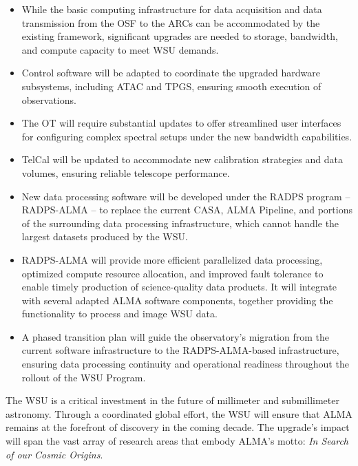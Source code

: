 \begin{itemize}[itemsep=-0.5em]
    \item While the basic computing infrastructure for data acquisition and data transmission from the \ac{OSF} to the \aclp{ARC} can be accommodated by the existing framework, significant upgrades are needed to storage, bandwidth, and compute capacity to meet WSU demands.

    \item Control software will be adapted to coordinate the upgraded hardware subsystems, including \ac{ATAC} and \ac{TPGS}, ensuring smooth execution of observations.

    \item The \ac{OT} will require substantial updates to offer streamlined user interfaces for configuring complex spectral setups under the new bandwidth capabilities.

    \item \ac{TelCal} will be updated to accommodate new calibration strategies and data volumes, ensuring reliable telescope performance.

    \item New data processing software will be developed under the \ac{RADPS} program -- \ac{RADPS-ALMA} -- to replace the current \ac{CASA}, ALMA Pipeline, and portions of the surrounding data processing infrastructure, which cannot handle the largest datasets produced by the WSU.

    \item \ac{RADPS-ALMA} will provide more efficient parallelized data processing, optimized compute resource allocation, and improved fault tolerance to enable timely production of science-quality data products. It will integrate with several adapted ALMA software components, together providing the functionality to process and image WSU data.

    \item A phased transition plan will guide the observatory’s migration from the current software infrastructure to the \ac{RADPS-ALMA}-based infrastructure, ensuring data processing continuity and operational readiness throughout the rollout of the WSU Program. 
\end{itemize}


\vspace*{0.5cm} 
The \ac{WSU} is a critical investment in the future of millimeter and submillimeter astronomy. Through a coordinated global effort, the WSU will ensure that ALMA remains at the forefront of discovery in the coming decade. The upgrade’s impact will span the vast array of research areas that embody ALMA’s motto: \textit{In Search of our Cosmic Origins}.
